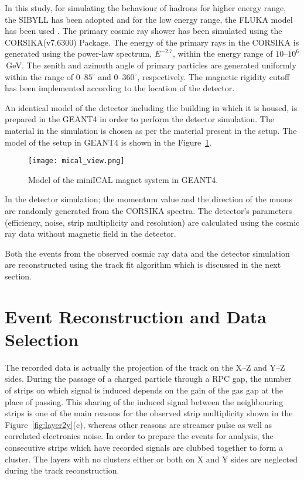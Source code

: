 In this study, for simulating the behaviour of hadrons for higher
energy range, the SIBYLL has been adopted and
for the low energy range, the FLUKA model has been used
\cite{corsika763}. The primary cosmic ray shower has been simulated
using the CORSIKA(v7.6300) Package. The energy of the primary rays in
the CORSIKA is generated using the power-law spectrum, $E^{-2.7}$,
within the energy range of \mbox{$10$--$10^{6}$\,GeV}. The zenith and
azimuth angle of primary particles are generated uniformly within the
range of \mbox{$0$--$85^\circ$} and \mbox{$0$--$360^\circ$},
respectively. The magnetic rigidity cutoff has been implemented
according to the location of the detector.

An identical model of the detector including the building in which it
is housed, is prepared in the GEANT4 in order to perform the detector
simulation. The material in the simulation is chosen as per the
material present in the setup. The model of the setup in GEANT4 is
shown in the Figure~\ref{fig:miniICAL_view}.
\begin{figure}[h]
  \centering
  \texttt{[image: mical\_view.png]}
  \caption{Model of the miniICAL magnet system in GEANT4.}
  \label{fig:miniICAL_view}
\end{figure}
In the detector simulation; the momentum value and the direction
of the muons are randomly generated from the CORSIKA spectra.
The detector's parameters (efficiency, noise, strip multiplicity and
resolution) are calculated using the cosmic ray data without magnetic
field in the detector.

Both the events from the observed cosmic ray data and the detector
simulation are reconstructed using the track fit algorithm which is
discussed in the next section.

\section{Event Reconstruction and Data Selection} \label{sec:momreco}
The recorded data is actually the projection of the track on the
\mbox{X--Z} and \mbox{Y--Z} sides. During the passage of a charged
particle through a RPC gap, the number of strips on which signal is
induced depends on the gain of the gas gap at the place of passing.
This sharing of the induced signal between the neighbouring strips is
one of the main reasons for the observed strip multiplicity shown in the
Figure~\ref{fig:layer2y}(c), whereas other reasons are streamer pulse
as well as correlated electronics noise.
In order to prepare the events for analysis, the consecutive strips
which have recorded signals are clubbed together to form a cluster.
The layers with no clusters either or both on X and Y sides are
neglected during the track reconstruction.

